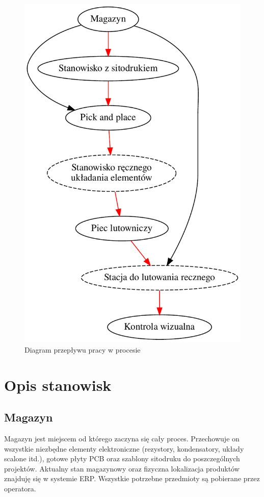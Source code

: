 \begin{figure}[H]
	\centering
	\includegraphics[scale=0.5]{./chapters/chapter2/flow_work.pdf}
	\caption{Diagram przepływu pracy w procesie}
	\label{DiagFlow}
\end{figure}

\section{Opis stanowisk}

\subsection{Magazyn}
Magazyn jest miejscem od którego zaczyna się cały proces.
Przechowuje on wszystkie niezbędne elementy elektroniczne (rezystory, kondensatory, układy scalone itd.), gotowe płyty PCB oraz szablony sitodruku do poszczególnych projektów.
Aktualny stan magazynowy oraz fizyczna lokalizacja produktów znajduję się w systemie ERP\@.
Wszystkie potrzebne przedmioty są pobierane przez operatora.

